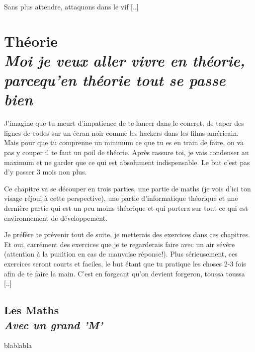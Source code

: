 \documentclass[a4paper, 11pt, oneside, draft]{book}
\newcommand\Chapter[2]{
	\chapter[#1]{#1\\[2ex]\Large\itshape#2}
}
\newcommand\Section[2]{
	\section[#1]{#1\\[1ex]\large\itshape#2}
}
\begin{document}
Sans plus attendre, attaquons dans le vif [..]

\mainmatter

\Chapter{Th\'eorie}{Moi je veux aller vivre en th\'eorie, parcequ'en th\'eorie tout se passe bien}
J'imagine que tu meurt d'impatience de te lancer dans le concret, de taper des lignes de codes sur un \'ecran noir comme les hackers
dans les films am\'ericain. Mais pour que tu comprenne un minimum ce que tu es en train de faire, on va pas y couper il te faut
un poil de th\'eorie. Apr\`es rassure toi, je vais condenser au maximum et ne garder que ce qui est absolument indispensable. Le but
c'est pas d'y passer 3 mois non plus.

Ce chapitre va se d\'ecouper en trois parties, une partie de maths (je vois d'ici ton visage r\'ejoui \`a cette perspective), une partie
d'informatique th\'eorique et une derni\`ere partie qui est un peu moins th\'eorique et qui portera sur tout ce qui est environnement
de d\'eveloppement.

Je pr\'ef\`ere te pr\'evenir tout de suite, je metterais des exercices dans ces chapitres. Et oui, carr\'ement des exercices que je te regarderais
faire avec un air s\'ev\`ere (attention \`a la punition en cas de mauvaise r\'eponse!). Plus s\'erieusement, ces exercices seront courts
et faciles, le but \'etant que tu pratique les choses 2-3 fois afin de te faire la main. C'est en forgeant qu'on devient forgeron, toussa toussa [..]


\Section{Les Maths}{Avec un grand 'M'}
blablabla

\backmatter

\tableofcontents
\end{document}
